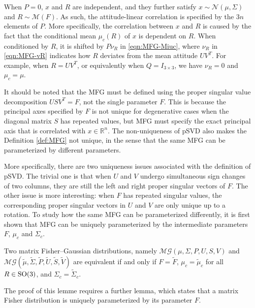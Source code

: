 When $P=0$, $x$ and $R$ are independent, and they further satisfy $x\sim\mathcal{N}(\mu,\Sigma)$ and $R\sim\mathcal{M}(F)$.
As such, the attitude-linear correlation is specified by the $3n$ elements of $P$.
More specifically, the correlation between $x$ and $R$ is caused by the fact that the conditional mean $\mu_c(R)$ of $x$ is dependent on $R$. 
When conditioned by $R$, it is shifted by $P\nu_R$ in \eqref{eqn:MFG-Miuc}, where $\nu_R$ in \eqref{eqn:MFG-vR} indicates how $R$ deviates from the mean attitude $UV^T$. 
For example, when $R=UV^T$, or equivalently when $Q=I_{3\times 3}$, we have $\nu_R=0$ and $\mu_c=\mu$.

It should be noted that the MFG must be defined using the proper singular value decomposition $USV^T = F$, not the single parameter $F$.
This is because the principal axes specified by $F$ is not unique for degenerative cases when the diagonal matrix $S$ has repeated values, but MFG must specify the exact principal axis that is correlated with $x\in\mathbb{R}^n$.
The non-uniqueness of pSVD also makes the Definition \ref{def:MFG} not unique, in the sense that the same MFG can be parameterized by different parameters.

More specifically, there are two uniqueness issues associated with the definition of pSVD.
The trivial one is that when $U$ and $V$ undergo simultaneous sign changes of two columns, they are still the left and right proper singular vectors of $F$.
The other issue is more interesting: when $F$ has repeated singular values, the corresponding proper singular vectors in $U$ and $V$ are only unique up to a rotation.
To study how the same MFG can be parameterized differently, it is first shown that MFG can be uniquely parameterized by the intermediate parameters $F$, $\mu_c$ and $\Sigma_c$.

\begin{lemma} \label{lemma:MFG-equivalent-intermediate}
	Two matrix Fisher--Gaussian distributions, namely $\mathcal{MG}(\mu,\allowbreak \Sigma,\allowbreak P,\allowbreak U,\allowbreak S,\allowbreak V)$ and $\mathcal{MG}(\tilde{\mu},\allowbreak \tilde{\Sigma},\allowbreak \tilde{P},\allowbreak \tilde{U},\allowbreak \tilde{S},\allowbreak \tilde{V})$ are equivalent if and only if $F=\tilde{F}$, $\mu_c = \tilde{\mu}_c$ for all $R\in\mathrm{SO}(3)$, and $\Sigma_c = \tilde{\Sigma}_c$.
\end{lemma}

The proof of this lemme requires a further lemma, which states that a matrix Fisher distribution is uniquely parameterized by its parameter $F$.

